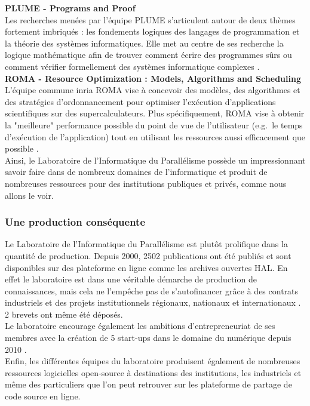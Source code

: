 \textbf{PLUME - Programs and Proof}\\
Les recherches menées par l'équipe PLUME s'articulent autour de deux thèmes fortement imbriqués : les fondements logiques des langages de programmation et la théorie des systèmes informatiques. Elle met au centre de ses recherche la logique mathématique afin de trouver comment écrire des programmes sûrs ou comment vérifier formellement des systèmes informatique complexes \cite{plume}.\\

\textbf{ROMA - Resource Optimization : Models, Algorithms and Scheduling}\\
L'équipe commune \gls{inria} ROMA vise à concevoir des modèles, des algorithmes et des stratégies d'ordonnancement pour optimiser l'exécution d'applications scientifiques sur des supercalculateurs. Plus spécifiquement, ROMA vise à obtenir la "meilleure" performance possible du point de vue de l'utilisateur (e.g.\ le temps d'exécution de l'application) tout en utilisant les ressources aussi efficacement que possible \cite{roma}.\\

Ainsi, le Laboratoire de l'Informatique du Parallélisme possède un impressionnant savoir faire dans de nombreux domaines de l'informatique et produit de nombreuses ressources pour des institutions publiques et privés, comme nous allons le voir.

\subsubsection{Une production conséquente}
Le Laboratoire de l'Informatique du Parallélisme est plutôt prolifique dans la quantité de production. Depuis 2000, 2502 publications ont été publiés et sont disponibles sur des plateforme en ligne comme les archives ouvertes HAL. En effet le laboratoire est dans une véritable démarche de production de connaissances, mais cela ne l'empêche pas de s'autofinancer grâce à des contrats industriels et des projets institutionnels régionaux, nationaux et internationaux \cite{reportHCERES}. 2 brevets ont même été déposés.\\

Le laboratoire encourage également les ambitions d'entrepreneuriat de ses membres avec la création de 5 start-ups dans le domaine du numérique depuis 2010 \cite{presUCBL}.\\

Enfin, les différentes équipes du laboratoire produisent également de nombreuses ressources logicielles open-source à destinations des institutions, les industriels et même des particuliers que l'on peut retrouver sur les plateforme de partage de code source en ligne.